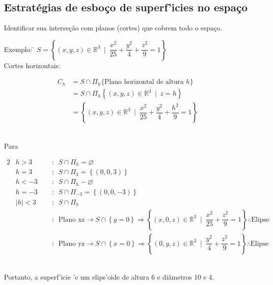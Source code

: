 \documentclass{article}
\begin{document}
\subsection{Estrat\'egias de esbo\c{c}o de superf\a'icies no espa\c{c}o}
Identificar sua interse\c{c}\~ao com planos (cortes) que cobrem todo o espa\c{c}o. \\[-10pt]
\begin{tabbing}
  Exemplo: \= $S = \left\{ (x, y, z) \in \mathbb{R}^3 \enspace \bigg| \enspace \dfrac{x^2}{25} + \dfrac{y^2}{4} + \dfrac{z^2}{9} = 1 \right\}$ \\[5pt]
  \> Cortes horizontais: \\[-5pt]
  \>\begin{minipage}{.5 \textwidth}
    \begin{align*}
      C_h &= S \cap \Pi_h\{ \text{Plano horizontal de altura $h$} \} \\
      &= S \cap \Pi_h\left\{ (x, y, z) \in \mathbb{R}^3 \enspace \big| \enspace z = h \right\} \\
      &= \left\{ (x, y, z) \in \mathbb{R}^3 \enspace \bigg| \enspace \dfrac{x^2}{25} + \dfrac{y^2}{4} + \dfrac{h^2}{9} = 1 \right\}
    \end{align*}
  \end{minipage}\\
  \> Para\\[-10pt]
  \>\quad\begin{minipage}{.35 \textwidth}
    \begin{alignat*}{2}
      &h > 3   \enspace &&: \enspace S \cap \Pi_h = \varnothing \\[5pt]
      &h = 3   \enspace &&: \enspace S \cap \Pi_3 = \left\{ (0,0,3) \right\} \\[5pt]
      &h < -3  \enspace &&: \enspace S \cap \Pi_h - \varnothing \\[5pt]
      &h = -3  \enspace &&: \enspace S \cap \Pi_{-3} = \left\{ (0,0,-3) \right\} \\[5pt]
      &|h| < 3 \enspace &&: \enspace S \cap \Pi_h \\[-5pt]
      & &&: \enspace \text{Plano xz} \rightarrow S \cap \left\{ y = 0 \right\} \Rightarrow \left\{ (x, 0, z) \in \mathbb{R}^3 \enspace \bigg| \enspace \dfrac{x^2}{25} + \dfrac{z^2}{9} = 1 \right\} \therefore \text{Elipse} \\
      & &&: \enspace \text{Plano yz} \rightarrow S \cap \left\{ x = 0 \right\} \Rightarrow \left\{ (0, y, z) \in \mathbb{R}^3 \enspace \bigg| \enspace \dfrac{y^2}{4} + \dfrac{z^2}{9} = 1 \right\} \therefore \text{Elipse}
    \end{alignat*}
  \end{minipage}\\[10pt]
  \> Portanto, a superf\a'icie \a'e um elips\a'oide de altura 6 e di\^ametros 10 e 4.
\end{tabbing}
\end{document}
